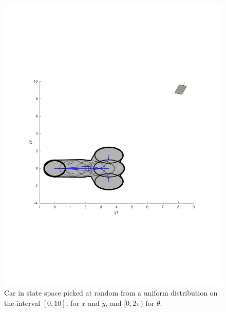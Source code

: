 \begin{figure}
  \includegraphics[scale=.5]{figures/rrtfunnel/modified-euclidean-distance-closest-funnel1}
  \caption{Car in state space picked at random from a uniform distribution on
    the interval \([0,10]\), for \(x\) and \(y\), and \([0,2\pi)\) for \(\theta\).}
\end{figure}

